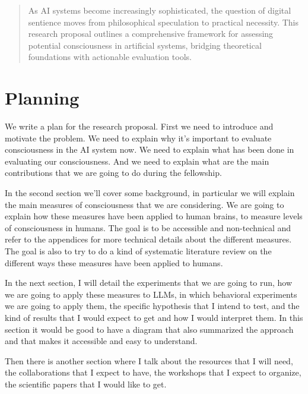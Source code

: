 \documentclass[11pt,a4paper]{article}
\begin{document}
\newpage
\begin{abstract}
\noindent

As AI systems become increasingly sophisticated, the question of digital sentience moves from philosophical speculation to practical necessity. This research proposal outlines a comprehensive framework for assessing potential consciousness in artificial systems, bridging theoretical foundations with actionable evaluation tools. 


\end{abstract}

\tableofcontents
\newpage
\section{Planning}
We write a plan for the research proposal. First we need to introduce and motivate the problem. We need to explain why it's important to evaluate consciousness in the AI system now. We need to explain what has been done in evaluating our consciousness. And we need to explain what are the main contributions that we are going to do during the fellowship.

In the second section we'll cover some background, in particular we will explain the main measures of consciousness that we are considering. We are going to explain how these measures have been applied to human brains, to measure levels of consciousness in humans. The goal is to be accessible and non-technical and refer to the appendices for more technical details about the different measures. The goal is also to try to do a kind of systematic literature review on the different ways these measures have been applied to humans.

In the next section, I will detail the experiments that we are going to run, how we are going to apply these measures to LLMs, in which behavioral experiments we are going to apply them, the specific hypothesis that I intend to test, and the kind of results that I would expect to get and how I would interpret them. In this section it would be good to have a diagram that also summarized the approach and that makes it accessible and easy to understand.

Then there is another section where I talk about the resources that I will need, the collaborations that I expect to have, the workshops that I expect to organize, the scientific papers that I would like to get.
\end{document}
